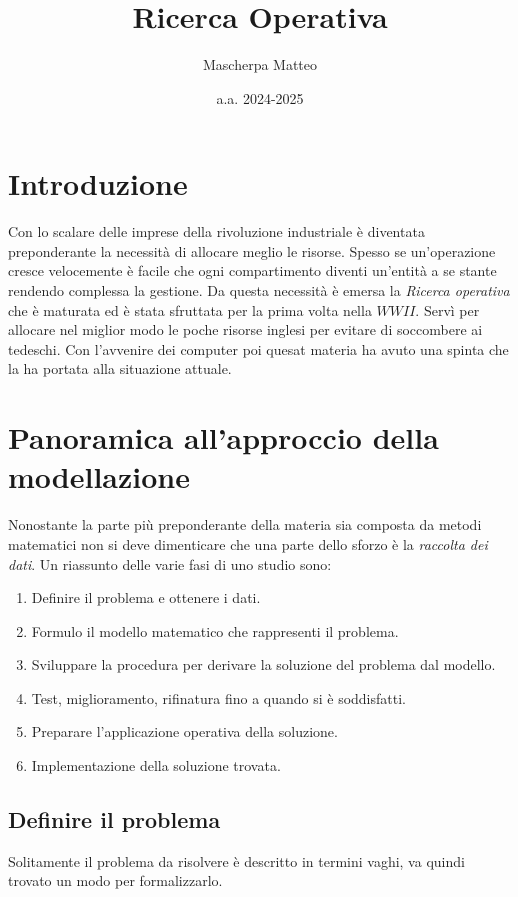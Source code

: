\documentclass{article}
\title{Ricerca Operativa}
\author{Mascherpa Matteo}
\date{a.a. 2024-2025}
\begin{document}
\maketitle

  \section{Introduzione}
    Con lo scalare delle imprese della rivoluzione industriale è diventata preponderante la necessità di allocare meglio le risorse. Spesso se un'operazione cresce velocemente è facile che ogni compartimento diventi un'entità a se stante rendendo complessa la gestione. Da questa necessità è emersa la \textit{Ricerca operativa} che è maturata ed è stata sfruttata per la prima volta nella $WWII$. Servì per allocare nel miglior modo le poche risorse inglesi per evitare di soccombere ai tedeschi. Con l'avvenire dei computer poi quesat materia ha avuto una spinta che la ha portata alla situazione attuale.

  \section{Panoramica all'approccio della modellazione}
    Nonostante la parte più preponderante della materia sia composta da metodi matematici non si deve dimenticare che una parte dello sforzo è la \textit{raccolta dei dati}.
    Un riassunto delle varie fasi di uno studio sono:
    \begin{enumerate}
      \item Definire il problema e ottenere i dati.
      \item Formulo il modello matematico che rappresenti il problema.
      \item Sviluppare la procedura per derivare la soluzione del problema dal modello.
      \item Test, miglioramento, rifinatura fino a quando si è soddisfatti.
      \item Preparare l'applicazione operativa della soluzione.
      \item Implementazione della soluzione trovata.
    \end{enumerate}

    \subsection{Definire il problema}
      Solitamente il problema da risolvere è descritto in termini vaghi, va quindi trovato un modo per formalizzarlo. 
\end{document}
